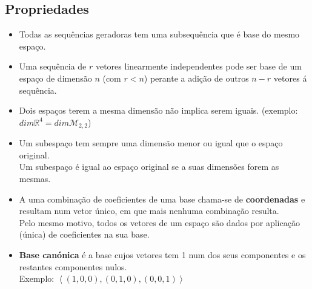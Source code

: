 \documentclass[]{report}
\begin{document}
\subsection{Propriedades}
\begin{itemize}
\item Todas as sequências geradoras tem uma subsequência que é base do mesmo espaço.
\item Uma sequência de $r$ vetores linearmente independentes pode ser base de um espaço de dimensão $n$ (com $r<n$) perante a adição de outros $n-r$ vetores á sequência.
\item  Dois espaços terem a mesma dimensão não implica serem iguais. (exemplo: $dim \mathbb{R}^4 = dim \mathcal{M}_{2, 2} $)
\item  Um subespaço tem sempre uma dimensão menor ou igual que o espaço original.\\
Um subespaço é igual ao espaço original se a suas dimensões forem as mesmas.
\item  A uma combinação de coeficientes de uma base chama-se de \textbf{coordenadas} e resultam num vetor único, em que mais nenhuma combinação resulta.\\
Pelo mesmo motivo, todos os vetores de um espaço são dados por aplicação (única) de coeficientes na sua base.
\item \textbf{Base canónica} é a base cujos vetores tem 1 num dos seus componentes e os restantes componentes nulos.\\
Exemplo: $\left\langle (1, 0, 0), (0, 1, 0), (0, 0, 1) \right\rangle$
\end{itemize}
\end{document}
